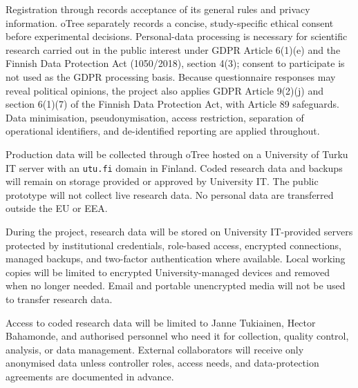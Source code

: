 Registration through  records acceptance of its general rules and privacy information. oTree separately records a concise, study-specific ethical consent before experimental decisions. Personal-data processing is necessary for scientific research carried out in the public interest under GDPR Article 6(1)(e) and the Finnish Data Protection Act (1050/2018), section 4(3); consent to participate is not used as the GDPR processing basis. Because questionnaire responses may reveal political opinions, the project also applies GDPR Article 9(2)(j) and section 6(1)(7) of the Finnish Data Protection Act, with Article 89 safeguards.  Data minimisation, pseudonymisation, access restriction, separation of operational identifiers, and de-identified reporting are applied throughout.

Production data will be collected through oTree hosted on a University of Turku IT server with an \texttt{utu.fi} domain in Finland. Coded research data and backups will remain on storage provided or approved by University IT. The public prototype will not collect live research data. No personal data are transferred outside the EU or EEA.

During the project, research data will be stored on University IT-provided servers protected by institutional credentials, role-based access, encrypted connections, managed backups, and two-factor authentication where available. Local working copies will be limited to encrypted University-managed devices and removed when no longer needed. Email and portable unencrypted media will not be used to transfer research data.

Access to coded research data will be limited to Janne Tukiainen, Hector Bahamonde, and authorised personnel who need it for collection, quality control, analysis, or data management.  External collaborators will receive only anonymised data unless controller roles, access needs, and data-protection agreements are documented in advance.


